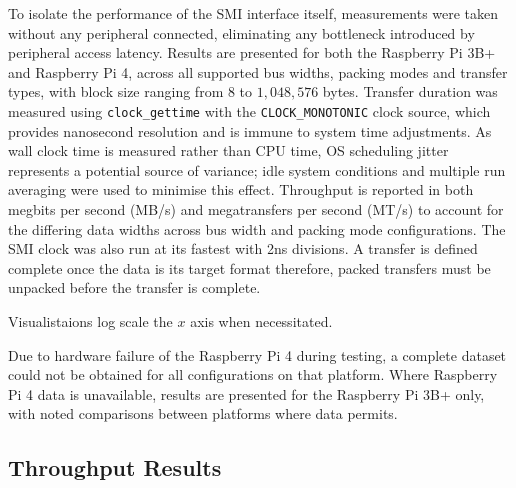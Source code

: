 \documentclass[final]{cmpreport}
\begin{document}
To isolate the performance of the SMI interface itself, measurements were taken without any peripheral connected, eliminating any bottleneck introduced by peripheral access latency. Results are presented for both the Raspberry Pi 3B+ and Raspberry Pi 4, across all supported bus widths, packing modes and transfer types, with block size ranging from $8$ to $1,048,576$ bytes. Transfer duration was measured using \texttt{clock\_gettime} with the \texttt{CLOCK\_MONOTONIC} clock source, which provides nanosecond resolution and is immune to system time adjustments. As wall clock time is measured rather than CPU time, OS scheduling jitter represents a potential source of variance; idle system conditions and multiple run averaging were used to minimise this effect. Throughput is reported in both megbits per second (MB/s) and megatransfers per second (MT/s) to account for the differing data widths across bus width and packing mode configurations. The SMI clock was also run at its fastest with 2ns divisions. A transfer is defined complete once the data is its target format therefore, packed transfers must be unpacked before the transfer is complete.

Visualistaions log scale the $x$ axis when necessitated.

Due to hardware failure of the Raspberry Pi 4 during testing, a complete dataset could not be obtained for all configurations on that platform. Where Raspberry Pi 4 data is unavailable, results are presented for the Raspberry Pi 3B+ only, with noted comparisons between platforms where data permits.

\subsection{Throughput Results}
\end{document}
